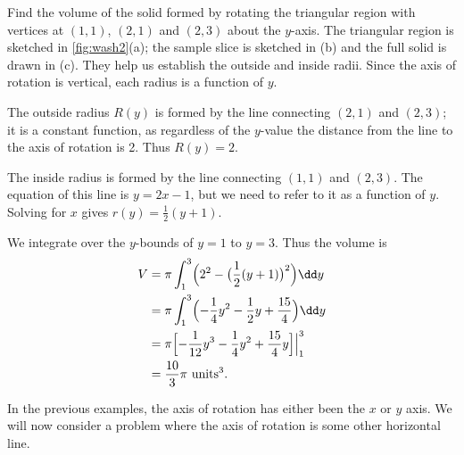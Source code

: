 \begin{example}\label{ex_wash2}%
Find the volume of the solid formed by rotating the triangular region with vertices at $(1,1)$, $(2,1)$ and $(2,3)$ about the $y$-axis.
\solution
The triangular region is sketched in \autoref{fig:wash2}(a); the sample slice is sketched in (b) and the full solid is drawn in (c). They help us establish the outside and inside radii. Since the axis of rotation is vertical, each radius is a function of $y$. 

The outside radius $R(y)$ is formed by the line connecting $(2,1)$ and $(2,3)$; it is a constant function, as regardless of the $y$-value the distance from the line to the axis of rotation is 2. Thus $R(y)=2$.

The inside radius is formed by the line connecting $(1,1)$ and $(2,3)$. The equation of this line is $y=2x-1$, but we need to refer to it as a function of $y$. Solving for $x$ gives $r(y) = \frac12(y+1)$. 

We integrate over the $y$-bounds of $y=1$ to $y=3$. Thus the volume is
\begin{align*}
V 	&=	\pi\int_1^3\Bigl(2^2 - \bigl(\frac12(y+1)\bigr)^2\Bigr)\dd y \\
		&=	\pi\int_1^3\Bigl(-\frac14y^2-\frac12y+\frac{15}4\Bigr)\dd y \\
		&= 	\pi\Bigl[-\frac1{12}y^3-\frac14y^2+\frac{15}4y\Bigr]\Big|_1^3\\
		&= \frac{10}3\pi %
		\ \text{units}^3.
\end{align*}
\end{example}

In the previous examples, the axis of rotation has either been the $x$ or $y$ axis. We will now consider a problem where the axis of rotation is some other horizontal line.

